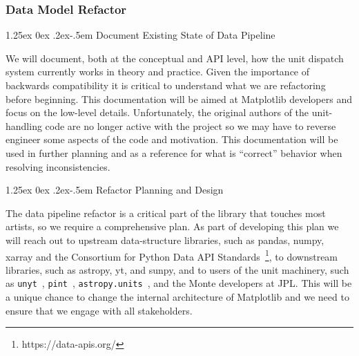 \documentclass[12pt]{article}
\makeatletter
\numberwithin{page}{section}
\renewcommand{\paragraph}{%
  \@startsection{paragraph}{4}%
  {\z@}{1.25ex \@plus 0ex \@minus .2ex}{-.5em}%
  {\normalfont\normalsize\itshape\bfseries}%
}
\makeatother
\begin{document}
\subsubsection{Data Model Refactor}

\paragraph{Document Existing State of Data Pipeline}

We will document, both at the conceptual and API level, how the unit
dispatch system currently works in theory and practice.  Given the
importance of backwards compatibility it is critical to understand
what we are refactoring before beginning.  This documentation will be
aimed at Matplotlib developers and focus on the low-level details.
Unfortunately, the original authors of the unit-handling code are no
longer active with the project so we may have to reverse engineer some
aspects of the code and motivation.  This documentation will be used
in further planning and as a reference for what is ``correct''
behavior when resolving inconsistencies.



\paragraph{Refactor Planning and Design}

The data pipeline refactor is a critical part of the library that
touches most artists, so we require a comprehensive plan.  As part of
developing this plan we will reach out to upstream data-structure
libraries, such as pandas, numpy, xarray and the Consortium for Python
Data API Standards~\footnote{https://data-apis.org/}, to downstream
libraries, such as astropy, yt, and sunpy, and to users of the unit
machinery, such as \texttt{unyt}~\cite{Goldbaum2018},
\texttt{pint}~\cite{pint}, \texttt{astropy.units}~\cite{astropy:2013,
  astropy:2018, astropyunits}, and the Monte developers at JPL.  This
will be a unique chance to change the internal architecture of
Matplotlib and we need to ensure that we engage with all stakeholders.
\end{document}
